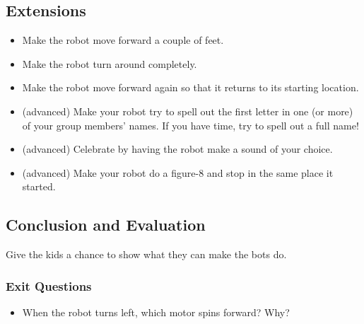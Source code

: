 \documentclass{lessonplan}
\begin{document}
    \subsection{Extensions}
      \begin{itemize}
        \item Make the robot move forward a couple of feet.
        \item Make the robot turn around completely.
        \item Make the robot move forward again so that it returns to its starting location.	
        \item (advanced) Make your robot try to spell out the first letter in one (or more) of your group members’ names. If you have time, try to spell out a full name!
        \item (advanced) Celebrate by having the robot make a sound of your choice.
        \item (advanced) Make your robot do a figure-8 and stop in the same place it started.
        
      \end{itemize}
    \subsection{Conclusion and Evaluation}
      Give the kids a chance to show what they can make the bots do.
      \subsubsection{Exit Questions}
      \begin{itemize}
        \item When the robot turns left, which motor spins forward? Why?
      \end{itemize}
\end{document}
